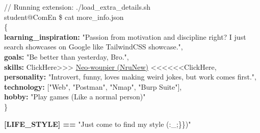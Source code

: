\documentclass{article}
\begin{document}
\vspace{0.2in}

\noindent
\textcolor{CommentGreen}{// Running extension: ./load\_extra\_details.sh} \\
\textcolor{KeywordBlue}{student@ComEn} \textcolor{CMD_Gray}{\$ cat more\_info.json} \\

\vspace{0.1in}
\noindent \{ \\
\hspace{20pt} \textbf{learning\_inspiration:} \textcolor{StringOrange}{"Passion from motivation and discipline right? I just search showcases on Google like TailwindCSS showcase."}, \\
\hspace{20pt} \textbf{goals:} \textcolor{StringOrange}{"Be better than yesterday, Bro."}, \\
\hspace{20pt} \textbf{skills:} \textcolor{KeywordBlue}{ClickHere>>>} \href{https://github.com/Neo-woupier}{\textcolor{StringOrange}{Neo-woupier (NruNew)}} \textcolor{KeywordBlue}{<<<<<<ClickHere}, \\
\hspace{20pt} \textbf{personality:} \textcolor{StringOrange}{"Introvert, funny, loves making weird jokes, but work comes first."}, \\
\hspace{20pt} \textbf{technology:} [\textcolor{KeywordBlue}{"Web"}, \textcolor{KeywordBlue}{"Postman"}, \textcolor{KeywordBlue}{"Nmap"}, \textcolor{KeywordBlue}{"Burp Suite"}], \\
\hspace{20pt} \textbf{hobby:} \textcolor{StringOrange}{"Play games (Like a normal person)"} \\
\noindent \} \\

\vspace{0.2in}

\begin{center}
    \Large \textbf{\textcolor{KeywordBlue}{[LIFE\_STYLE]} ==} \textcolor{StringOrange}{"Just come to find my style (:\_;\}\})"}
\end{center}

\vfill
\newpage
\pagecolor{CMD_Black}
\color{CMD_Gray}
\end{document}
